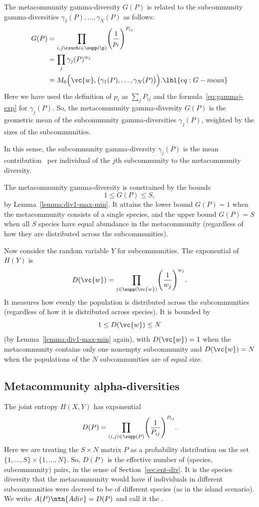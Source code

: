 The metacommunity gamma-diversity $G(P)$ is related to the subcommunity
gamma-diversities $\gamma_1(P), \ldots, \gamma_N(P)$ as follows:
% 
\begin{align}
G(P)    &
=
\prod_{i, j \csuch i \in \supp(\p)}
\Biggl( \frac{1}{p_i} \Biggr)^{P_{ij}}  
\nonumber       \\
&
=
\prod_j \gamma_j(P)^{w_j}  
\nonumber       \\
&
=
M_0 \Bigl( \vc{w}, \bigl(\gamma_1(P), \ldots, \gamma_N(P)\bigr) \Bigr).
\lbl{eq:G-mean}
\end{align}
% 
Here we have used the definition of $p_i$ as $\sum_j P_{ij}$ and the
formula~\eqref{eq:gammaj-exp} for $\gamma_j(P)$.  So, the metacommunity
gamma-diversity $G(P)$ is the geometric mean of the subcommunity
gamma-diversities $\gamma_j(P)$, weighted by the sizes of the
subcommunities. 

In this sense, the subcommunity gamma-diversity $\gamma_j(P)$ is the mean
contribution~ per individual of the $j$th subcommunity
to the metacommunity diversity.

The metacommunity gamma-diversity is constrained by the bounds
\[
1 \leq G(P) \leq S,
\]
by Lemma~\ref{lemma:div1-max-min}.  It attains the lower bound $G(P) = 1$
when the metacommunity consists of a single species, and the upper bound
$G(P) = S$ when all $S$ species have equal abundance in the metacommunity
(regardless of how they are distributed across the subcommunities).

Now consider the random variable $Y$ for subcommunities. The exponential of
$H(Y)$ is
\[
D(\vc{w}) 
=
\prod_{j \in \supp(\vc{w})} \Biggl( \frac{1}{w_j} \Biggr)^{w_j}.
\]
It measures how evenly the population is distributed across the
subcommunities (regardless of how it is distributed across species).  It is
bounded by
\[
1 \leq D(\vc{w}) \leq N
\]
(by Lemma~\ref{lemma:div1-max-min} again), with $D(\vc{w}) = 1$ when the
metacommunity contains only one nonempty subcommunity and $D(\vc{w}) =
N$ when the populations of the $N$ subcommunities are of equal size.  


\subsection*{Metacommunity alpha-diversities}

The joint%
%
% 
entropy $H(X, Y)$ has exponential
\[
D(P)
=
\prod_{(i, j) \in \supp(P)} 
\Biggl( \frac{1}{P_{ij}} \Biggr)^{P_{ij}}.
\]
Here we are treating the $S \times N$ matrix $P$ as a probability
distribution on the set $\{1, \ldots, S\} \times \{1, \ldots, N\}$.  So,
$D(P)$ is the effective number of (species, subcommunity) pairs, in the
sense of Section~\ref{sec:ent-div}.  It is the species
diversity that the metacommunity would have if individuals in different
subcommunities were decreed to be of different species (as in the island%
%
% 
scenario).  We write $A(P)\ntn{Adiv} = D(P)$ and call it the .%
% 
%


